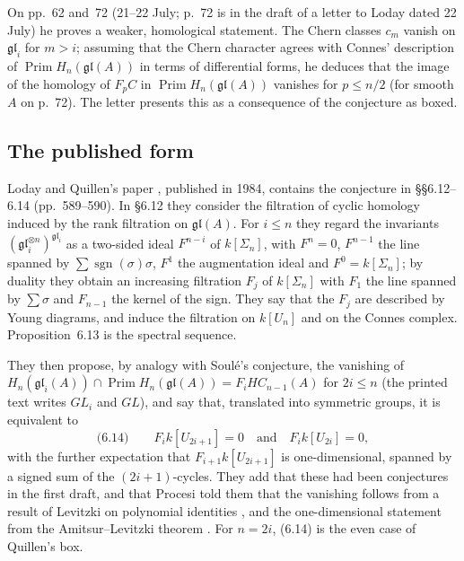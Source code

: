 \documentclass[11pt,a4paper]{amsart}
\theoremstyle{definition}
\theoremstyle{remark}
\newcommand{\gl}{\mathfrak{gl}}
\newcommand{\Prim}{\operatorname{Prim}}
\newcommand{\sgn}{\operatorname{sgn}}
\begin{document}
On pp.~62 and~72 (21--22 July; p.~72 is in the draft of a letter to Loday dated 22 July) he proves a weaker, homological statement. The Chern classes $c_m$ vanish on $\gl_i$ for $m > i$; assuming that the Chern character agrees with Connes' description of $\Prim H_n(\gl(A))$ in terms of differential forms, he deduces that the image of the homology of $F_p C$ in $\Prim H_n(\gl(A))$ vanishes for $p \le n/2$ (for smooth $A$ on p.~72). The letter presents this as a consequence of the conjecture as boxed.

\subsection*{The published form}
Loday and Quillen's paper \cite{lq}, published in 1984, contains the conjecture in \S\S6.12--6.14 (pp.~589--590). In \S6.12 they consider the filtration of cyclic homology induced by the rank filtration on $\gl(A)$. For $i \le n$ they regard the invariants $(\gl_i^{\otimes n})^{\gl_i}$ as a two-sided ideal $F^{n-i}$ of $k[\Sigma_n]$, with $F^n = 0$, $F^{n-1}$ the line spanned by $\sum \sgn(\sigma)\sigma$, $F^1$ the augmentation ideal and $F^0 = k[\Sigma_n]$; by duality they obtain an increasing filtration $F_j$ of $k[\Sigma_n]$ with $F_1$ the line spanned by $\sum \sigma$ and $F_{n-1}$ the kernel of the sign. They say that the $F_j$ are described by Young diagrams, and induce the filtration on $k[U_n]$ and on the Connes complex. Proposition~6.13 is the spectral sequence.

They then propose, by analogy with Soulé's conjecture, the vanishing of $H_n(\gl_i(A)) \cap \Prim H_n(\gl(A)) = F_i HC_{n-1}(A)$ for $2i \le n$ (the printed text writes $GL_i$ and $GL$), and say that, translated into symmetric groups, it is equivalent to
\[
\text{(6.14)} \qquad F_i k[U_{2i+1}] = 0 \quad\text{and}\quad F_i k[U_{2i}] = 0,
\]
with the further expectation that $F_{i+1} k[U_{2i+1}]$ is one-dimensional, spanned by a signed sum of the $(2i+1)$-cycles. They add that these had been conjectures in the first draft, and that Procesi told them that the vanishing follows from a result of Levitzki on polynomial identities \cite{levitzki}, and the one-dimensional statement from the Amitsur--Levitzki theorem \cite{al}. For $n = 2i$, (6.14) is the even case of Quillen's box.
\end{document}
